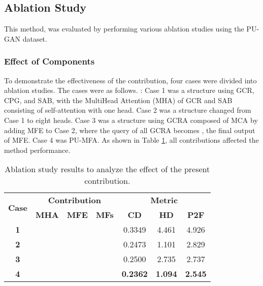 \documentclass{article}
\begin{document}
\subsection{Ablation Study}
\quad This method, was evaluated by performing various ablation studies using the PU-GAN dataset.

\subsubsection{Effect of Components}
\quad To demonstrate the effectiveness of the contribution, four cases were divided into ablation studies. The cases were as follows. : Case 1 was a structure using GCR, CPG, and SAB, with the MultiHead Attention (MHA) of GCR and SAB consisting of self-attention with one head. Case 2 was a structure changed from Case 1 to eight heads. Case 3 was a structure using GCRA composed of MCA by adding MFE to Case 2, where the query of all GCRA becomes , the final output of MFE. Case 4 was PU-MFA. As shown in Table \ref{tab:ablation_components}, all contributions affected the method performance.

\begin{table}[htb!]
\centering
\resizebox{0.5\columnwidth}{!}
{\begin{tabular}{@{}c|ccc|ccc@{}}
\toprule
\multirow{2}{*}{\textbf{Case}} & \multicolumn{3}{c|}{\textbf{Contribution}}  & \multicolumn{3}{c}{\textbf{Metric}}               \\ \cmidrule(l){2-7} 
                               & \textbf{MHA} & \textbf{MFE} & \textbf{MFs} & \textbf{CD}     & \textbf{HD}    & \textbf{P2F}   \\ \midrule
\textbf{1}                     &              &              &               & 0.3349          & 4.461          & 4.926          \\
\textbf{2}                     &              &              &               & 0.2473          & 1.101          & 2.829          \\
\textbf{3}                     &              &              &               & 0.2500          & 2.735          & 2.737          \\ \midrule
\textbf{4}                     &              &              &               & \textbf{0.2362} & \textbf{1.094} & \textbf{2.545} \\ \bottomrule
\end{tabular}}
\caption{Ablation study results to analyze the effect of the present contribution.}
\label{tab:ablation_components}
\end{table}
\end{document}
